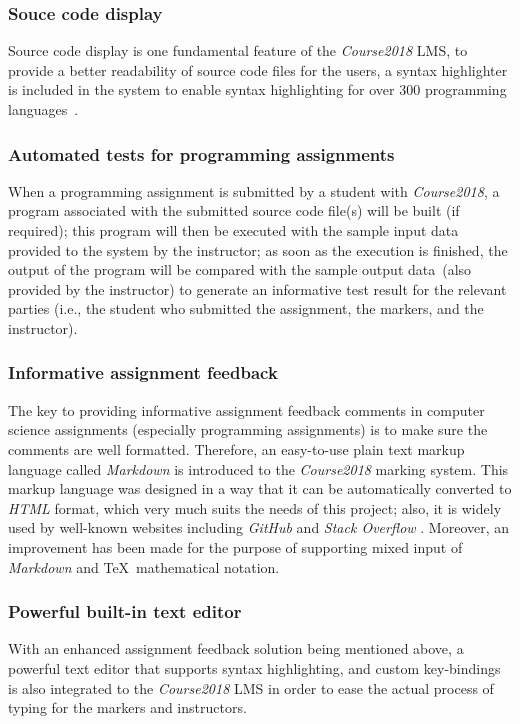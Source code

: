 \subsubsection{Souce code display}
Source code display is one fundamental feature of the \emph{Course2018} LMS,
to provide a better readability of source code files for the users,
a syntax highlighter is included in the system to enable syntax
highlighting \cite{syntaxHighlighting} for over 300 programming
languages~\cite{pygmentsLangs}.

\subsubsection{Automated tests for programming assignments}
When a programming assignment is submitted by a student with \emph{Course2018},
a program associated with the submitted source code file(s) will be built
(if required); this program
will then be executed with the sample input data provided to the system
by the instructor;
as soon as the execution is finished, 
the output of the program will be compared with the sample output data~(also
provided by the instructor) to
generate an informative test result for the relevant parties (i.e., the student
who submitted the assignment, the markers, and the instructor).

\subsubsection{Informative assignment feedback}
The key to providing informative assignment feedback comments in computer
science assignments (especially programming assignments) is to make sure the
comments are well formatted.
Therefore, an easy-to-use plain text markup language called \emph{Markdown}
is introduced to the \emph{Course2018} marking system. This markup language was
designed in a way that it can be automatically converted to \emph{HTML} format,
which very much suits the needs of this project;
also, it is
widely used by well-known websites including \emph{GitHub} \cite{gitHubMarkdown}
and \emph{Stack Overflow} \cite{stackOverflowMarkdown}.
Moreover, an improvement has been made for the purpose of supporting mixed
input of \emph{Markdown} and \TeX\ mathematical notation.

\subsubsection{Powerful built-in text editor}
With an enhanced assignment feedback solution being mentioned above, a powerful
text editor that supports syntax highlighting, and custom key-bindings is also
integrated to the \emph{Course2018} LMS in order to ease the actual process of
typing for the markers and instructors.